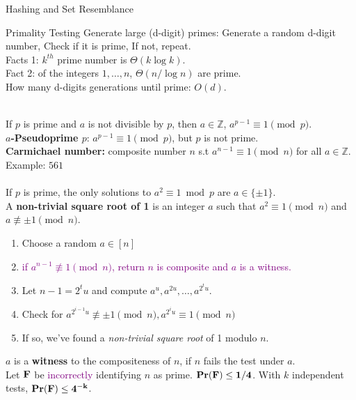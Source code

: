 \documentclass[10pt,a4paper]{article}
\begin{document}
\begin{multicols}{3}
\begin{textbox}{Hashing and Set Resemblance}
    \end{textbox}

    \begin{textbox}{Primality Testing}
         Generate large (d-digit) primes:
        Generate a random d-digit number, Check if it is prime, If not, repeat.\\

        Facts 1: $k^{th}$ prime number is $\Theta (k \log k)$.\\
        Fact 2: of the integers $1, \dots, n$, $\Theta(n/\log n)$ are prime.\\
        How many d-digits generations until prime: $O(d)$.

         \\
        If $p$ is prime and $a$ is not divisible by $p$, then $a \in \mathbb{Z}$, $a^{p-1} \equiv 1 \pmod{p}$.\\
        {\bf $a$-Pseudoprime $p$}: $a^{p-1} \equiv 1 \pmod{p}$, but $p$ is not prime.\\
        {\bf Carmichael number:} composite number $n$ s.t $a^{n-1} \equiv 1 \pmod{n}$ for all $a \in \mathbb{Z}$. Example: $561$ \\

         \\
        If $p$ is prime, the only solutions to $a^2 \equiv 1 \bmod p$ are $a \in \{\pm 1\}$. \\
        A {\bf non-trivial square root of 1} is an integer $a$ such that $a^2 \equiv 1 \pmod{n}$ and $a \not\equiv \pm 1 \pmod{n}$.\\
        \begin{enumerate}
            \item Choose a random $a \in [n]$
            \item \textcolor{purple}{if $a^{n-1} \not\equiv 1 \pmod{n}$, return $n$ is composite and $a$ is a witness.}
            \item Let $n-1 = 2^tu$ and compute $a^u, a^{2u},\ldots, a^{2^tu}$.
            \item Check for $a^{2^{i-1}u} \not\equiv \pm 1 \pmod{n}, a^{2^iu} \equiv 1 \pmod{n}$
            \item If so, we've found a {\em non-trivial square root} of 1 modulo $n$.
        \end{enumerate}
        $a$ is a {\bf witness} to the compositeness of $n$, if $n$ fails the test under $a$.\\
         Let ${\bf F}$ be \textcolor{purple}{incorrectly} identifying $n$ as prime.  ${\bf Pr(F) \leq 1/4}$. With $k$ independent tests, $ {\bf Pr(F) \leq 4^{-k}}$.


\end{textbox}
\end{multicols}
\end{document}
